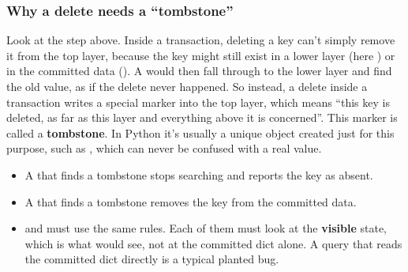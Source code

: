 \documentclass[10pt,a4paper]{article}
\begin{document}
\subsubsection{Why a delete needs a “tombstone”}
Look at the  step above. Inside a transaction, deleting a key can’t simply remove it from the top layer, because the key might still exist in a lower layer (here ) or in the committed data (). A  would then fall through to the lower layer and find the old value, as if the delete never happened.
So instead, a delete inside a transaction writes a special marker into the top layer, which means “this key is deleted, as far as this layer and everything above it is concerned”. This marker is called a \textbf{tombstone}. In Python it’s usually a unique object created just for this purpose, such as , which can never be confused with a real value.
\begin{itemize}
\item A  that finds a tombstone stops searching and reports the key as absent.
\item A  that finds a tombstone removes the key from the committed data.
\item {} and  must use the same rules. Each of them must look at the \textbf{visible} state, which is what  would see, not at the committed dict alone. A query that reads the committed dict directly is a typical planted bug.
\end{itemize}
\end{document}
